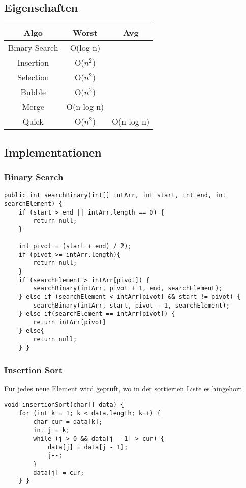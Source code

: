 \begin{multicols*}{5}
	\subsection{Eigenschaften}
	\renewcommand{\arraystretch}{1.1}
	\begin{tabular}{c | c | c}
		Algo & Worst & Avg \\
		\hline
		Binary Search & O(log n) & \\
		Insertion & O($n^2$) &  \\
		Selection & O($n^2$) &  \\
		Bubble & O($n^2$) &  \\
		Merge & O(n log n) &  \\
		Quick & O($n^2$) & O(n log n)
	\end{tabular}
	
	\subsection{Implementationen}
		\subsubsection{Binary Search}
			\begin{lstlisting}
public int searchBinary(int[] intArr, int start, int end, int searchElement) {
	if (start > end || intArr.length == 0) {
		return null;
	}

	int pivot = (start + end) / 2);
	if (pivot >= intArr.length){
		return null;
	}
	if (searchElement > intArr[pivot]) {
		searchBinary(intArr, pivot + 1, end, searchElement);
	} else if (searchElement < intArr[pivot] && start != pivot) {
		searchBinary(intArr, start, pivot - 1, searchElement);
	} else if(searchElement == intArr[pivot]) {
		return intArr[pivot]
	} else{
		return null;
	} }
			\end{lstlisting}
		
		\subsubsection{Insertion Sort}
		Für jedes neue Element wird geprüft, wo in der sortierten Liste es hingehört
			\begin{lstlisting}
void insertionSort(char[] data) {
	for (int k = 1; k < data.length; k++) {
		char cur = data[k];
		int j = k;
		while (j > 0 && data[j - 1] > cur) {
			data[j] = data[j - 1];
			j--;
		}
		data[j] = cur;
	} }
			\end{lstlisting}
		

\end{multicols*}
